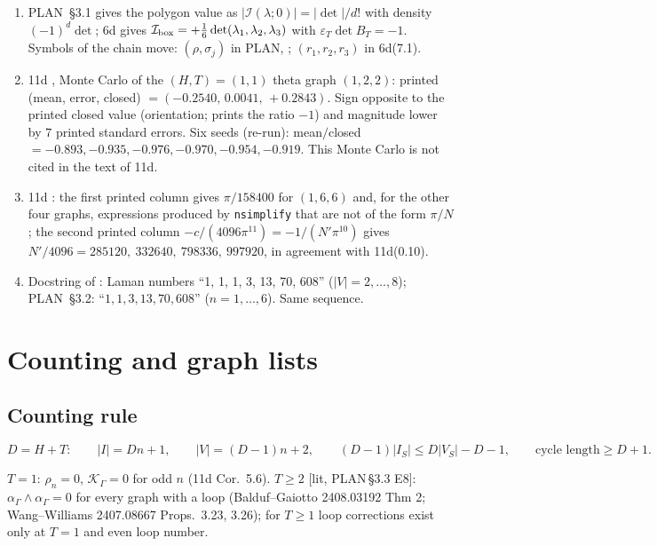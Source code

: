 \documentclass[10pt,a4paper]{article}
\numberwithin{equation}{section}
\newcommand{\cI}{\mathcal I}
\newcommand{\cK}{\mathcal K}
\newcommand{\LT}[3]{\textsf{L}\,#1\,#2{\scriptsize\,\texttt{#3}}}
\newcommand{\Sd}[1]{\textsf{6d}(#1)}
\newcommand{\Ed}[1]{\textsf{11d}(#1)}
\newcommand{\PL}[1]{\textsf{PLAN}\,\S#1}
\newcommand{\ptr}[2]{\par\nopagebreak{\footnotesize\raggedleft[\,#1\ $\mid$\ #2\,]\par}}
\newcommand{\st}[1]{\textsf{#1}}
\begin{document}
\begin{enumerate}
\item \textsf{PLAN}~\S3.1 gives the polygon value as $|\cI(\lambda;0)|=|\det|/d!$ with density $(-1)^d\det$; \textsf{6d} gives $\cI_{\rm box}=+\frac16\det(\lambda_1,\lambda_2,\lambda_3)$ with $\varepsilon_T\det B_T=-1$. Symbols of the chain move: $(\rho,\sigma_j)$ in \textsf{PLAN}, ; $(r_1,r_2,r_3)$ in \Sd{7.1}.
\item \textsf{11d} , Monte Carlo of the $(H,T)=(1,1)$ theta graph $(1,2,2)$: printed (mean, error, closed) $=(-0.2540,\,0.0041,\,+0.2843)$. Sign opposite to the printed closed value (orientation;  prints the ratio $-1$) and magnitude lower by $7$ printed standard errors. Six seeds (re-run): mean$/$closed $=-0.893,-0.935,-0.976,-0.970,-0.954,-0.919$. This Monte Carlo is not cited in the text of \textsf{11d}.
\item \textsf{11d} : the first printed column gives $\pi/158400$ for $(1,6,6)$ and, for the other four graphs, expressions produced by \texttt{nsimplify} that are not of the form $\pi/N$; the second printed column $-c/(4096\pi^{11})=-1/(N'\pi^{10})$ gives $N'/4096=285120,\ 332640,\ 798336,\ 997920$, in agreement with \Ed{0.10}.
\item Docstring of : Laman numbers ``1, 1, 1, 3, 13, 70, 608'' ($|V|=2,\dots,8$); \textsf{PLAN}~\S3.2: ``$1,1,3,13,70,608$'' ($n=1,\dots,6$). Same sequence.
\end{enumerate}

\section{Counting and graph lists}\label{sec-count}

\subsection{Counting rule}
\begin{equation}
D=H+T:\qquad|I|=Dn+1,\qquad|V|=(D-1)n+2,\qquad(D-1)|I_S|\le D|V_S|-D-1,\qquad\text{cycle length}\ge D+1 .
\end{equation}
\ptr{C1; \LT{Lemma}{4.4}{b-00207} ($D=2$); \Sd{5.11} ($D=3$); \textsf{11d} Lemmas 5.1, 5.2 ($D=6$); \textsf{GKW} ($n$-Laman, $n=H+T$)}{\st{P}}
$T=1$: $\rho_n=0$, $\cK_\Gamma=0$ for odd $n$ (\textsf{11d} Cor.~5.6). $T\ge2$ [\st{lit}, \PL{3.3} E8]: $\alpha_\Gamma\wedge\alpha_\Gamma=0$ for every graph with a loop (Balduf--Gaiotto 2408.03192 Thm 2; Wang--Williams 2407.08667 Props.\ 3.23, 3.26); for $T\ge1$ loop corrections exist only at $T=1$ and even loop number.
\end{document}
